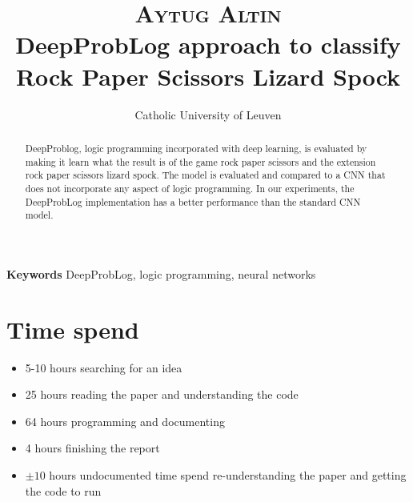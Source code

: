 \documentclass[10pt,letterpaper]{article}
\title{
		\usefont{OT1}{bch}{b}{n}
		\normalfont \normalsize \textsc{Aytug Altin} \\ [10pt]
		\huge  DeepProbLog approach to classify Rock Paper Scissors Lizard Spock\\
}
\author[0]{Catholic University of Leuven}
\begin{document}
\maketitle
{}

\begin{abstract}
	DeepProblog, logic programming incorporated with deep learning, is evaluated by making it learn what the result is of the game rock paper scissors and the extension rock paper scissors lizard spock. The model is evaluated and compared to a CNN that does not incorporate any aspect of logic programming. In our experiments, the DeepProbLog implementation has a better performance than the standard CNN model.
\end{abstract}


{\textbf{Keywords}
DeepProbLog, logic programming, neural networks}








\section{Time spend}
\begin{itemize}
	\item 5-10 hours searching for an idea 
	\item 25 hours reading the paper and understanding the code
	\item 64 hours programming and documenting
	\item 4 hours finishing the report
	\item $\pm 10$ hours undocumented time spend re-understanding the paper and getting the code to run
\end{itemize}





{}
\end{document}
